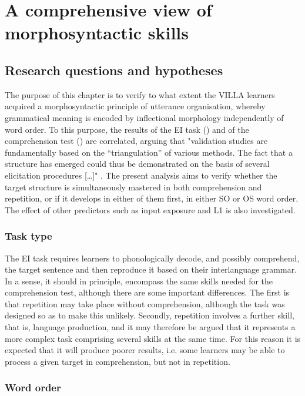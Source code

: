 \chapter{A comprehensive view of morphosyntactic skills}\label{sec:5}
\section{Research questions and hypotheses}\label{sec:06:1}

The purpose of this chapter is to verify to what extent the VILLA learners acquired a morphosyntactic principle of utterance organisation, whereby grammatical meaning is encoded by inflectional morphology independently of word order. To this purpose, the results of the EI task () and of the comprehension test () are correlated, arguing that "validation studies are fundamentally based on the “triangulation” of various methods. The fact that a structure has emerged could thus be demonstrated on the basis of several elicitation procedures […]" \citep[326]{Pallotti2006}. The present analysis aims to verify whether the target structure is simultaneously mastered in both comprehension and repetition, or if it develops in either of them first, in either SO or OS word order. The effect of other predictors such as input exposure and L1 is also investigated.

\subsection{Task type}\label{sec:06:1.1}

The EI task requires learners to phonologically decode, and possibly comprehend, the target sentence and then reproduce it based on their interlanguage grammar. In a sense, it should in principle, encompass the same skills needed for the comprehension test, although there are some important differences. The first is that repetition may take place without comprehension, although the task was designed so as to make this unlikely. Secondly, repetition involves a further skill, that is, language production, and it may therefore be argued that it represents a more complex task comprising several skills at the same time. For this reason it is expected that it will produce poorer results, i.e. some learners may be able to process a given target in comprehension, but not in repetition.

\subsection{Word order}\label{sec:06:1.2}

